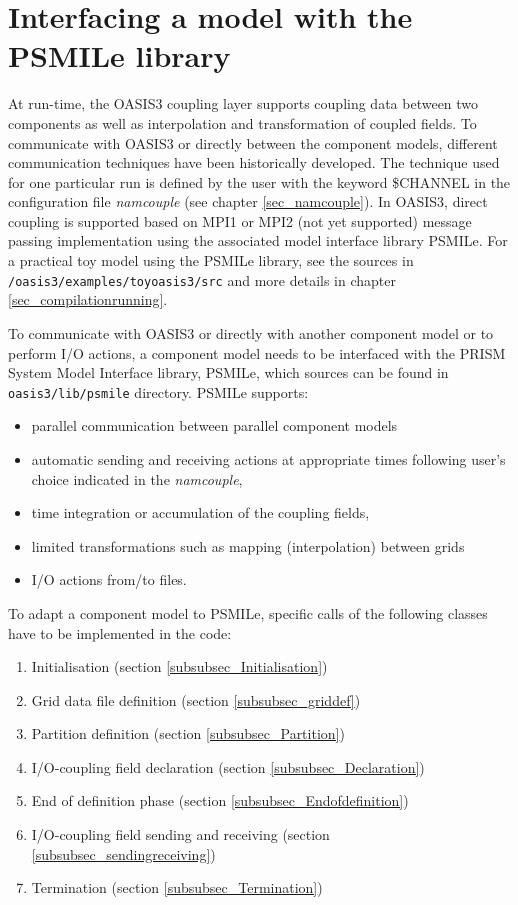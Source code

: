 \newpage
\chapter{Interfacing a model with the PSMILe library}
\label{sec_modelinterfacing}

At run-time, the OASIS3 coupling layer supports coupling data
between two components as well as interpolation and transformation
of coupled fields. To communicate with OASIS3 or directly between the component
models, different communication techniques have been historically
developed. The technique used for one particular run is defined by the
user with the keyword \$CHANNEL in the configuration file {\it namcouple} 
(see chapter
\ref{sec_namcouple}). In OASIS3, direct coupling is supported 
based on MPI1 or MPI2 (not yet supported) message passing implementation
using the associated model interface library PSMILe.  For
a practical toy model using the PSMILe library, see the sources in
{\tt /oasis3/examples/toyoasis3/src} and more details in
chapter \ref{sec_compilationrunning}.



 To communicate with OASIS3 or directly with another component model
  or to perform I/O actions, a component model needs to be interfaced
  with the PRISM System Model Interface library, PSMILe, which sources
  can be found in {\tt oasis3/lib/psmile} directory. PSMILe supports:

\begin{itemize}
\item parallel communication between parallel component models
\item automatic sending and receiving actions at appropriate times
 following user's choice indicated in the {\it namcouple},
\item time integration or accumulation of the coupling fields,
\item limited transformations such as mapping (interpolation) between grids
\item I/O actions from/to files.
\end{itemize}

 To adapt a component model to PSMILe, specific calls of
 the following classes have to be implemented in the code:

\begin{enumerate}
\item Initialisation (section \ref{subsubsec_Initialisation})
\item Grid data file definition (section \ref{subsubsec_griddef})
\item Partition definition (section \ref{subsubsec_Partition})
\item I/O-coupling field declaration (section \ref{subsubsec_Declaration})
\item End of definition phase (section \ref{subsubsec_Endofdefinition})
\item I/O-coupling field sending and receiving (section
\ref{subsubsec_sendingreceiving})
\item Termination (section \ref{subsubsec_Termination})
\end{enumerate}


